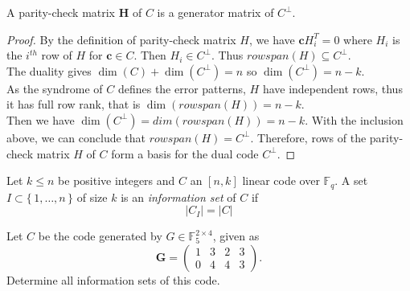 \begin{proposition}
A parity-check matrix $\mathbf{H}$ of $C$ is a generator matrix of $C^\perp$. 
\end{proposition}
\begin{proof}
    By the definition of parity-check matrix $H$, we have $\mathbf{c}H_i^T=0$ where $H_i$ is the $i^{th}$ row of $H$ for $\mathbf{c}\in C$. Then $H_i\in C^\perp$. Thus $rowspan(H) \subseteq C^\perp.$\\
    The duality gives $\dim(C)+\dim(C^\perp)=n$ so $\dim(C^\perp)=n-k$.\\
    As the syndrome of $C$ defines the error patterns, $H$ have independent rows, thus it has full row rank, that is $\dim(rowspan(H))=n-k$.\\
    Then we have $\dim(C^\perp)=dim(rowspan(H))=n-k$. With the inclusion above, we can conclude that $rowspan(H) = C^\perp$.
    Therefore, rows of the parity-check matrix $H$ of $C$ form a basis for the dual code $C^\perp$.
\end{proof}
\vspace{1.0cm}
\begin{definition}
Let $k \leq n$ be positive integers and $C$ an $[n, k]$ linear code over $\mathbb{F}_q$. A set $I \subset \{\,1, \dots, n\,\}$ of size $k$ is an \textit{information set} of $C$ if
\[
\left|C_I\right| = \left|C|\right. 
\]
\end{definition}
\begin{exmp}
Let $C$ be the code generated by $G \in \mathbb{F}_5^{2 \times 4}$, given as
\[
\mathbf{G} =
\begin{pmatrix}
1 & 3 & 2 & 3 \\
0 & 4 & 4 & 3
\end{pmatrix}.
\]
Determine all information sets of this code.
\end{exmp}
